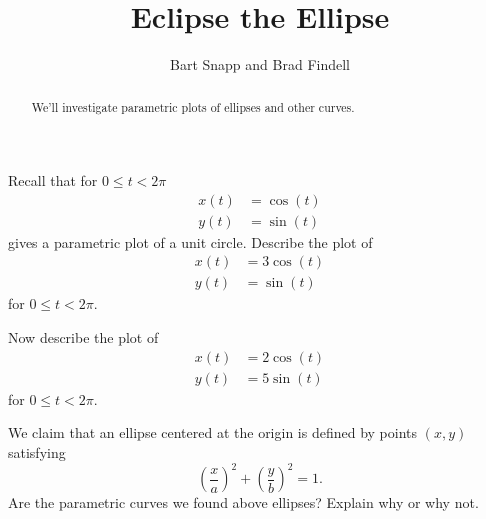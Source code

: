 \documentclass[nooutcomes]{ximera}
\title{Eclipse the Ellipse}
\author{Bart Snapp and Brad Findell}
\begin{document}
\begin{abstract}
  We'll investigate parametric plots of ellipses and other curves.
\end{abstract}
\maketitle


\begin{problem} 
Recall that for $0\le t<2\pi$ 
\begin{align*}
x(t) &= \cos(t)\\ 
y(t) &= \sin(t)
\end{align*}
gives a parametric plot of a unit circle. Describe the plot of
\begin{align*}
x(t) &= 3\cos(t)\\ 
y(t) &= \sin(t)
\end{align*}
for $0\le t<2\pi$.
\end{problem} 

\begin{problem}
Now describe the plot of 
\begin{align*}
x(t) &= 2\cos(t)\\ 
y(t) &= 5\sin(t)
\end{align*}
for $0\le t<2\pi$.
\end{problem}

\begin{problem}
We claim that an ellipse centered at the origin is defined by points
$(x,y)$ satisfying
\[
\left(\frac{x}{a}\right)^2 + \left(\frac{y}{b}\right)^2 = 1.
\]
Are the parametric curves we found above ellipses? Explain why or why
not. 
\end{problem}

\newpage
\end{document}
